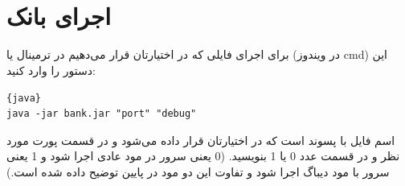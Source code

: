 \documentclass[]{article}
\begin{document}
\newpage
\pagestyle{fancy}
\fancyhf{}
\fancyfoot{}
\cfoot{\thepage}
\renewcommand{\headrulewidth}{2pt}

\KashidaOff



\tableofcontents

\newpage

 \Large \textbf{\\\\
}


\section*{{\titr اجرای بانک}}

برای اجرای فایلی که در اختیارتان قرار می‌دهیم در ترمینال یا (‌در ویندوز cmd) این دستور را وارد کنید:

\begin{latin}

\begin{lstlisting}{java}
java -jar bank.jar "port" "debug"
\end{lstlisting}

\end{latin}

 اسم فایل با پسوند  است که در اختیارتان قرار داده می‌شود و در قسمت  پورت مورد نظر و در قسمت  عدد 0 یا 1 بنویسید. (0  یعنی سرور در مود عادی اجرا شود و 1 یعنی سرور با مود دیباگ اجرا شود و تفاوت این دو مود در پایین توضیح داده شده است.)
\end{document}
